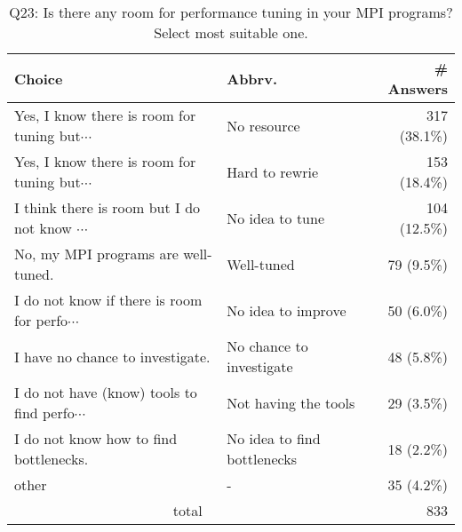 \begin{table}[htb]%
\begin{center}%
\caption{Q23: Is there any room for performance tuning in your MPI programs? Select most suitable one.}%
\label{tab:Q23-ans}%
\begin{tabular}{l|l|r}%
\hline%
Choice & Abbrv. & \# Answers \\%
\hline%
{\small Yes, I know there is room for tuning but$\cdots$} & No resource & 317 (38.1\%) \\%
{\small Yes, I know there is room for tuning but$\cdots$} & Hard to rewrie & 153 (18.4\%) \\%
{\small I think there is room but I do not know $\cdots$} & No idea to tune & 104 (12.5\%) \\%
No, my MPI programs are well-tuned. & Well-tuned & 79 (9.5\%) \\%
{\small I do not know if there is room for perfo$\cdots$} & No idea to improve & 50 (6.0\%) \\%
I have no chance to investigate. & No chance to investigate & 48 (5.8\%) \\%
{\small I do not have (know) tools to find perfo$\cdots$} & Not having the tools & 29 (3.5\%) \\%
I do not know how to find bottlenecks. & No idea to find bottlenecks & 18 (2.2\%) \\%
other & - & 35 (4.2\%) \\%
\hline%
\multicolumn{2}{c}{total} & 833 \\%
\hline%
\end{tabular}%
\end{center}%
\end{table}%
